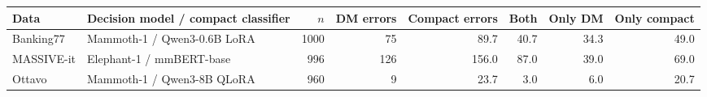 \begin{tabular}{llrrrrrr}
\toprule
Data & Decision model / compact classifier & $n$ & DM errors & Compact errors & Both & Only DM & Only compact \\
\midrule
Banking77 & Mammoth-1 / Qwen3-0.6B LoRA & 1000 & 75 & 89.7 & 40.7 & 34.3 & 49.0 \\
MASSIVE-it & Elephant-1 / mmBERT-base & 996 & 126 & 156.0 & 87.0 & 39.0 & 69.0 \\
Ottavo & Mammoth-1 / Qwen3-8B QLoRA & 960 & 9 & 23.7 & 3.0 & 6.0 & 20.7 \\
\bottomrule
\end{tabular}